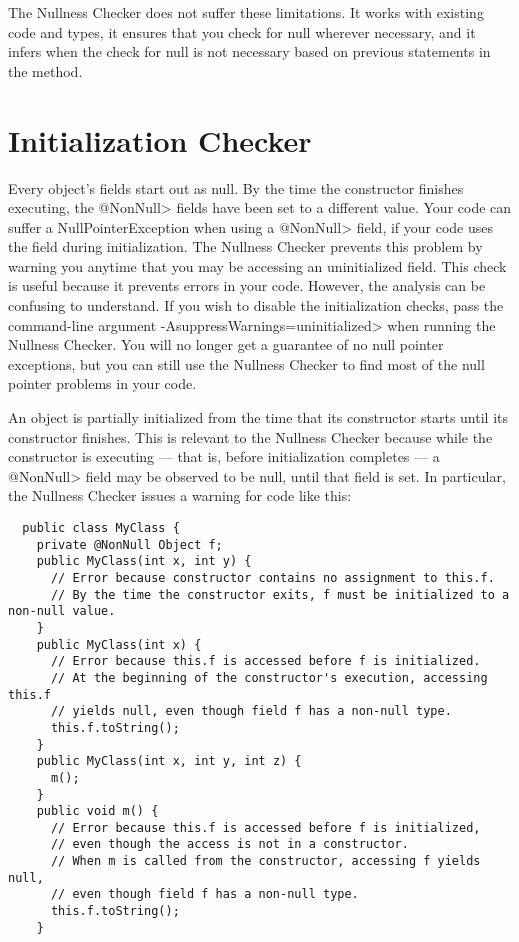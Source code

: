 The Nullness Checker does not suffer these limitations.  It works with
existing code and types, it ensures that you check for null wherever
necessary, and it infers when the check for null is not necessary based on
previous statements in the method.


\section{Initialization Checker\label{initialization-checker}}

Every object's fields start out as null.  By the time the constructor
finishes executing, the \<@NonNull> fields have been set to a different
value.  Your code can suffer a NullPointerException when using a
\<@NonNull> field, if your code uses the field during initialization.
The Nullness Checker prevents this problem by warning you anytime that you
may be accessing an uninitialized field.  This check is useful because it
prevents errors in your code.  However, the analysis can be confusing to
understand.  If you wish to disable the initialization checks, pass the
command-line argument \<-AsuppressWarnings=uninitialized> when running the
Nullness Checker.  You will no longer get a guarantee of no null pointer
exceptions, but you can still use the Nullness Checker to find most of the
null pointer problems in your code.


An object is partially initialized from the time that its constructor starts until its constructor
finishes.  This is relevant to the Nullness Checker because while the
constructor is executing --- that is, before initialization completes ---
a \<@NonNull>
field may be observed to be null, until that field is set.  In
particular, the Nullness Checker issues a warning for code like this:

\begin{Verbatim}
  public class MyClass {
    private @NonNull Object f;
    public MyClass(int x, int y) {
      // Error because constructor contains no assignment to this.f.
      // By the time the constructor exits, f must be initialized to a non-null value.
    }
    public MyClass(int x) {
      // Error because this.f is accessed before f is initialized.
      // At the beginning of the constructor's execution, accessing this.f
      // yields null, even though field f has a non-null type.
      this.f.toString();
    }
    public MyClass(int x, int y, int z) {
      m();
    }
    public void m() {
      // Error because this.f is accessed before f is initialized,
      // even though the access is not in a constructor.
      // When m is called from the constructor, accessing f yields null,
      // even though field f has a non-null type.
      this.f.toString();
    }
\end{Verbatim}

